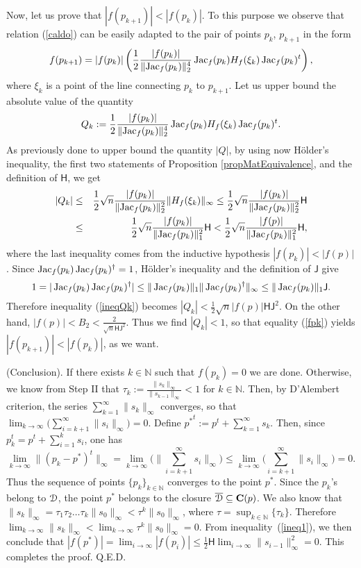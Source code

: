 \documentclass[10pt]{article}
\newcommand\qed{{\hspace*{\fill}Q.E.D.\vskip12pt plus 1pt}}
\newcommand\sD{{\cal D}}
\newcommand\N{{\mathbb N}}
\def\Jac{\mathop{\rm Jac}\nolimits}
\begin{document}
Now, let us prove that $|f(p_{k+1})| < |f(p_k)|$. To this purpose we observe
that relation (\ref{caldo}) can be easily adapted to the pair of points $p_k$, $p_{k+1}$
in the form
\begin{eqnarray}\label{fpk}
f(p_{k+1}) = |f(p_k)| \left ( 
\frac{1}{2} \frac{|f(p_k)|}{\|{\rm Jac}_f(p_k)\|_2^4} \Jac_f(p_k) H_f(\xi_k) \Jac_f(p_k)^t \right ),
\end{eqnarray}
where $\xi_k$ is a point of the line connecting $p_k$ to $p_{k+1}$.
Let us upper bound the absolute value of the quantity
$$
Q_k:= \frac{1}{2} \frac{|f(p_k)|}{\|{\rm Jac}_f(p_k)\|_2^4} \Jac_f(p_k) H_f(\xi_k) \Jac_f(p_k)^t.
$$
As  previously done to upper bound the quantity $|Q|$, by using now H\"older's inequality, the first two statements  of 
Proposition \ref{propMatEquivalence}, and the definition of $\mathsf H$, we get
\begin{eqnarray}\label{ineqQk}
|Q_k| 
&\le&  \frac{1}{2} \sqrt{n} \frac{|f(p_k)|}{\|{\rm Jac}_f(p_k)\|_2^2}   \|H_f(\xi_k)\|_\infty
\le  \frac{1}{2}\sqrt{n}  \frac{|f(p_k)|}{\|{\rm Jac}_f(p_k)\|_2^2}  \mathsf H \nonumber\\
&\le&  \frac{1}{2}\sqrt{n}  \frac{|f(p_k)|}{\|{\rm Jac}_f(p_k)\|_1^2}  \mathsf H 
<  \frac{1}{2}\sqrt{n}  \frac{|f(p)|}{\|{\rm Jac}_f(p_k)\|_1^2}  \mathsf H, 
\end{eqnarray}
where the last inequality comes from the inductive hypothesis $|f(p_k)| < |f(p)|$.
Since $\Jac_f(p_k) \Jac_f(p_k)^\dagger = 1$, 
H\"older's inequality and the definition of $\mathsf J$ give
$$
1= |\Jac_f(p_k) \Jac_f(p_k)^\dagger| \le \|\Jac_f(p_k)\|_1  \|\Jac_f(p_k)^\dagger\|_\infty
\le \|\Jac_f(p_k)\|_1 \mathsf J. 
$$
Therefore inequality (\ref{ineqQk}) becomes
$|Q_k| <  \frac{1}{2}\sqrt{n}  |f(p)|  {\mathsf H} {\mathsf J}^2$.
On the other hand, $|f(p)| < B_2 < \frac{2}{\sqrt{n} \mathsf{H} \mathsf{J}^2}$.
Thus we  find $|Q_k|<1$,  so that equality (\ref{fpk})  
yields $|f(p_{k+1})| < |f(p_k)|$, as we want.
\smallskip

 (Conclusion). If there exists $k\in \N$ such that $f(p_k)=0$ we are done.
 Otherwise, 
 we know from Step II  that $\tau_k:=\frac{ \|s_k\|_\infty}{ \|s_{k-1}\|_\infty}<1$ for $k\in \N$.  Then, by D'Alembert criterion, the series $\sum_{k=1}^\infty\|s_k\|_\infty$ converges, so that $\lim_{k\to \infty}\big(\sum_{i=k+1}^\infty\|s_i\|_\infty\big)=0$. Define
${p^*}^t:=p^t+\sum_{k=1}^\infty s_k$. Then, since $p_k^t=p^t+\sum_{i=1}^ks_i$, one has
$$\lim_{k\to\infty}\|(p_k-p^*)^t\|_\infty=\lim_{k\to\infty}\Big(\|\sum_{i=k+1}^\infty s_i \|_\infty\Big)\leq \lim_{k\to \infty}\Big(\sum_{i=k+1}^\infty\|s_i\|_\infty\Big)=0.$$
Thus  the sequence of points $\{p_k\}_{k \in \N}$ converges to the point $p^*$. Since the  $p_k$'s belong to $\sD$, the point $p^*$ belongs to the closure $\overline{\sD}\subseteq {\bf C}(p)$.
We also know that $\| s_k\|_\infty=\tau_1\tau_2\ldots\tau_k\|s_0\|_\infty<\tau^k\|s_0\|_\infty$, where $\tau=\sup_{k\in \N}\{\tau_k\}$. Therefore $\lim_{k\to \infty}\|s_k\|_\infty< \lim_{k\to \infty}\tau^k\|s_0\|_\infty=0$.
From  inequality~(\ref{ineq1}), 
 we then conclude that 
$|f(p^*)|=\lim_{i\to \infty} |f(p_i)|\le  \frac{1}{2} \mathsf H\lim_{i\to \infty} \|s_{i-1}\|_\infty^2=0$. This completes the proof. 
\qed
 
\end{document}
